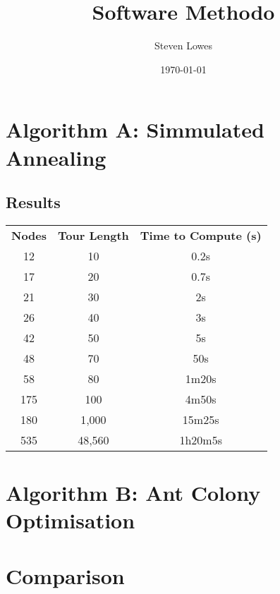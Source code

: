 \documentclass[a4paper, 11pt,table]{article}
\author{Steven Lowes}
\title{Software Methodo}
\date{\today{}}
\begin{document}
	\section{Algorithm A: Simmulated Annealing}
	
	\subsection{Results}
	\label{useCase:socialRespond}
	\begin{center}
		\begin{tabu}{|c c c|}
			\textbf{Nodes} & \textbf{Tour Length} & \textbf{Time to Compute (s)}\\
			
			12 & 10 & 0.2s \\
			17 & 20 & 0.7s\\
			21 & 30 & 2s\\
			26 & 40 & 3s\\
			42 & 50 & 5s\\
			48 & 70 & 50s\\
			58 & 80 & 1m20s\\
			175 & 100 & 4m50s\\
			180 & 1,000 & 15m25s\\
			535 & 48,560 & 1h20m5s\\
		\end{tabu}
	\end{center}
	
	\section{Algorithm B: Ant Colony Optimisation}
	
	\section{Comparison}
	
	\newpage

		\begin{multicols}{2}
		\end{multicols}
    
	
\end{document}
